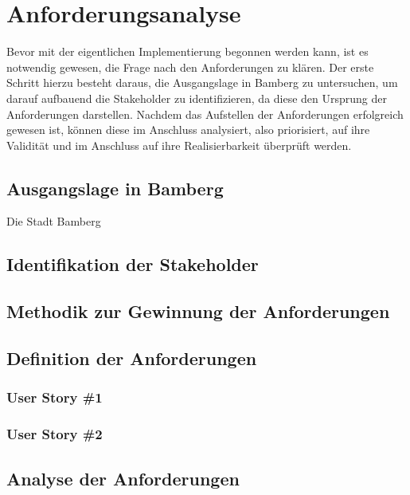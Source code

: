 \chapter{Anforderungsanalyse} %
Bevor mit der eigentlichen Implementierung begonnen werden kann, ist es notwendig gewesen, die Frage nach den Anforderungen zu klären. Der erste Schritt 
hierzu besteht daraus, die Ausgangslage in Bamberg zu untersuchen, um darauf aufbauend die Stakeholder zu identifizieren, da diese den Ursprung der Anforderungen 
darstellen. Nachdem das Aufstellen der Anforderungen erfolgreich gewesen ist, können diese im Anschluss analysiert, also priorisiert, auf ihre Validität und im Anschluss 
auf ihre Realisierbarkeit überprüft werden.

\section{Ausgangslage in Bamberg}
Die Stadt Bamberg 

\section{Identifikation der Stakeholder}

\section{Methodik zur Gewinnung der Anforderungen}

\section{Definition der Anforderungen}

\subsection{User Story \#1}

\subsection{User Story \#2}

\section{Analyse der Anforderungen}
